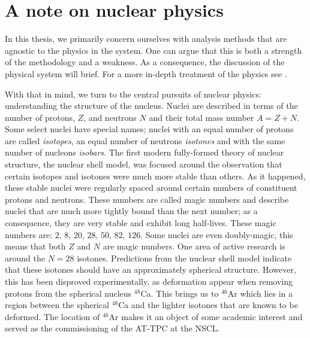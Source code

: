 

\section{A note on nuclear physics}

In this thesis, we primarily concern ourselves with analysis methods that are agnostic to the physics in the system. One can argue that this is both a strength of the methodology and a weakness. As a consequence, the discussion of the physical system will brief. For a more in-depth treatment of the physics see \cite{Bradt2017}. 

With that in mind, we turn to the central pursuits of nuclear physics: understanding the structure of the nucleus. Nuclei are described in terms of the number of protons, $Z$, and neutrons $N$ and their total mass number $A = Z +N$. Some select nuclei have special names; nuclei with an equal number of protons are called \textit{isotopes}, an equal number of neutrons \textit{isotones} and with the same number of nucleons \textit{isobars}. The first modern fully-formed theory of nuclear structure, the nuclear shell model, was focused around the observation that certain isotopes and isotones were much more stable than others. As it happened, these stable nuclei were regularly spaced around certain numbers of constituent protons and neutrons. These numbers are called magic numbers and describe nuclei that are much more tightly bound than the next number; as a consequence, they are very stable and exhibit long half-lives. These magic numbers are: $2 ,\, 8 ,\, 20 ,\, 28 ,\, 50 ,\, 82 ,\, 126$. Some nuclei are even doubly-magic, this means that both $Z$ and $N$ are magic numbers. One area of active research is around the $N=28$ isotones. Predictions from the nuclear shell model indicate that these isotones should have an approximately spherical structure. However, this has been disproved experimentally, as deformation appear when removing protons from the spherical nucleus ${}^{48}$Ca. This brings us to ${}^{46}$Ar which lies in a region between the spherical ${}^{48}$Ca and the lighter isotones that are known to be deformed. The location of ${}^{46}$Ar makes it an object of some academic interest and served as the commissioning of the AT-TPC at the NSCL. 


